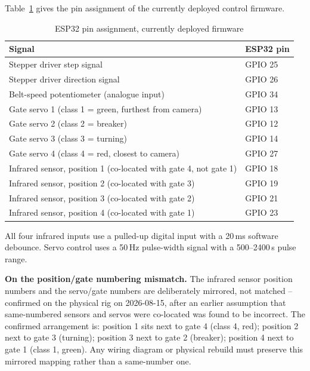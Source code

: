 Table~\ref{tab:appendixC_pins} gives the pin assignment of the currently deployed control firmware.

\begin{table}[H]
\caption{ESP32 pin assignment, currently deployed firmware}
\label{tab:appendixC_pins}
\centering
\begin{tabularx}{\textwidth}{p{6.0cm} X}
\toprule
\textbf{Signal} & \textbf{ESP32 pin} \\
\midrule
Stepper driver step signal & GPIO 25 \\
Stepper driver direction signal & GPIO 26 \\
Belt-speed potentiometer (analogue input) & GPIO 34 \\
Gate servo 1 (class 1 = green, furthest from camera) & GPIO 13 \\
Gate servo 2 (class 2 = breaker) & GPIO 12 \\
Gate servo 3 (class 3 = turning) & GPIO 14 \\
Gate servo 4 (class 4 = red, closest to camera) & GPIO 27 \\
Infrared sensor, position 1 (co-located with gate 4, not gate 1) & GPIO 18 \\
Infrared sensor, position 2 (co-located with gate 3) & GPIO 19 \\
Infrared sensor, position 3 (co-located with gate 2) & GPIO 21 \\
Infrared sensor, position 4 (co-located with gate 1) & GPIO 23 \\
\bottomrule
\end{tabularx}

\vspace{2mm}
{\footnotesize All four infrared inputs use a pulled-up digital input with a 20\,ms software debounce. Servo control uses a 50\,Hz pulse-width signal with a 500--2400\,\textmu s pulse range.}
\end{table}

\textbf{On the position/gate numbering mismatch.} The infrared sensor position numbers and the servo/gate numbers are deliberately mirrored, not matched -- confirmed on the physical rig on 2026-08-15, after an earlier assumption that same-numbered sensors and servos were co-located was found to be incorrect. The confirmed arrangement is: position 1 sits next to gate 4 (class 4, red); position 2 next to gate 3 (turning); position 3 next to gate 2 (breaker); position 4 next to gate 1 (class 1, green). Any wiring diagram or physical rebuild must preserve this mirrored mapping rather than a same-number one.

